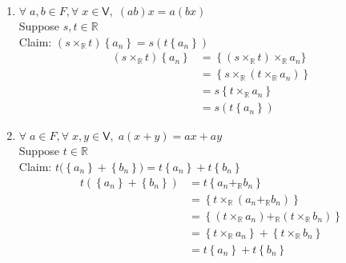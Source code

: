 \documentclass[letterpaper,12pt]{article}
\newcommand{\?}{\stackrel{?}{=}}
\begin{document}
\begin{spacing}{1.5}
\begin{enumerate}
\begin{enumerate}[(VS 1)]
\item $\forall\; a,b \in F, \forall\; x \in \mathsf{V}, \;
  \left(ab\right)x = a\left(bx\right)$
\\
Suppose $s,t \in \mathbb{R}$ 
\\
Claim: $ \left(s\times_\mathbb{R}t\right) \left\{a_n\right\} = s \left(t 
  \left\{a_n\right\}\right)$
\begin{align}
\left(s\times_\mathbb{R}t\right) \left\{a_n\right\} &=
\left\{\left(s\times_\mathbb{R}t\right)\times_\mathbb{R} a_n\}\\
&=
\left\{s\times_\mathbb{R}\left(t\times_\mathbb{R}a_n\right)\right\}\\
&= s\left\{t\times_\mathbb{R}a_n\right\}\\
&= s\left(t\left\{a_n\right\}\right)
\end{align}
\newpage{}
\item $\forall\; a \in F, \forall\; x,y \in \mathsf{V}, \;
  a\left(x+y\right) = ax + ay$
\\
Suppose $t\in\mathbb{R}$
\\
Claim: $ t\big(\left\{a_n\right\} + \left\{b_n\right\}\big) =
  t\left\{a_n\right\} + t\left\{b_n\right\}$
\begin{align}
t\left(\left\{a_n\right\} + \left\{b_n\right\}\right) &= t\left\{a_n
  +_\mathbb{R} b_n\right\} \\
&= \left\{t\times_\mathbb{R} \left(a_n +_\mathbb{R}
    b_n\right)\right\}\\
&= \left\{\left(t\times_\mathbb{R}a_n\right) +_\mathbb{R}
  \left(t\times_\mathbb{R}b_n\right)\right\}\\
&= \left\{t\times_\mathbb{R}a_n\right\} +
  \left\{t\times_\mathbb{R}b_n\right\}\\
 &= t\left\{a_n\right\} + t\left\{b_n\right\}
\end{align}


\end{enumerate}
\end{enumerate}
\end{spacing}
\end{document}
